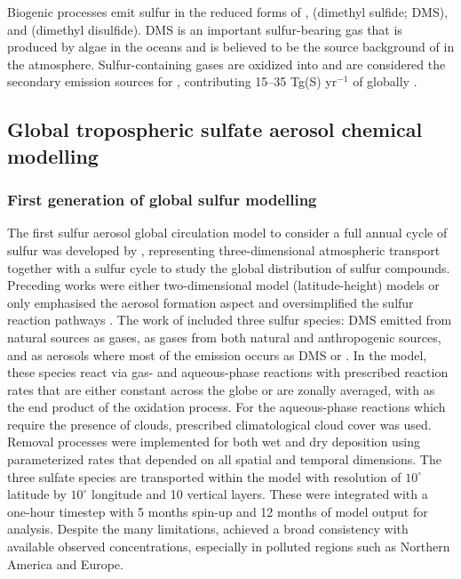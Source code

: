 Biogenic processes emit sulfur in the reduced forms of ,  (dimethyl sulfide; DMS), and  (dimethyl disulfide). DMS is an important sulfur-bearing gas that is produced by algae in the oceans and is believed to be the source background of  in the atmosphere. Sulfur-containing gases are oxidized into  and are considered the secondary emission sources for , contributing 15--35 Tg(S) yr$^{-1}$ of  globally \citep{lanaUpdatedClimatologySurface2011}.


\subsection{Global tropospheric sulfate aerosol chemical modelling} %
\label{section1.2}

\subsubsection{First generation of global sulfur modelling}

The first sulfur aerosol global circulation model to consider a full annual cycle of sulfur was developed by \citet{langnerGlobalThreedimensionalModel1991}, representing three-dimensional atmospheric transport together with a sulfur cycle to study the global distribution of sulfur compounds. Preceding works were either two-dimensional model (latitude-height) models \citep{rodheGlobalDistributionSulfur1980} or only emphasised the aerosol formation aspect and oversimplified the sulfur reaction pathways \citep{ericksoniiiGlobalOceantoatmosphereDimethyl1990}. The work of \citet{langnerGlobalThreedimensionalModel1991} included three sulfur species: DMS emitted from natural sources as gases,  as gases from both natural and anthropogenic sources, and  as aerosols where most of the emission occurs as DMS or . In the model, these species react via gas- and aqueous-phase reactions with prescribed reaction rates that are either constant across the globe or are zonally averaged, with  as the end product of the oxidation process. For the aqueous-phase reactions which require the presence of clouds, prescribed climatological cloud cover was used. Removal processes were implemented for both wet and dry deposition using parameterized rates that depended on all spatial and temporal dimensions. The three sulfate species are transported within the model with resolution of $10^\circ$ latitude by $10^\circ$ longitude and 10 vertical layers. These were integrated with a one-hour timestep with 5 months spin-up and 12 months of model output for analysis. Despite the many limitations, \citet{langnerGlobalThreedimensionalModel1991} achieved a broad consistency with available observed concentrations, especially in polluted regions such as Northern America and Europe.

